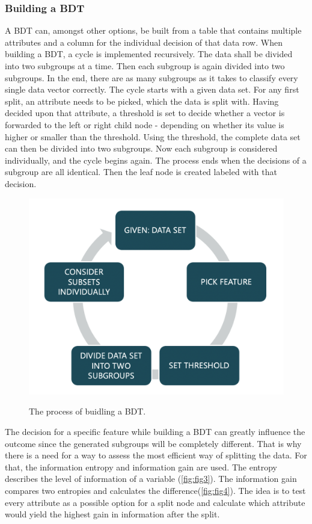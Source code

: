 \documentclass[
12pt,
headsepline,
bibliography=totoc,
twoside=semi,
fleqn
]{scrartcl}
\begin{document}
 \subsubsection{Building a BDT\label{sec:sec2-1-2}}
 A BDT can, amongst other options, be built from a table that contains multiple attributes and a column for the individual decision of that data row. When building a BDT, a cycle is implemented recursively. The data shall be divided into two subgroups at a time. Then each subgroup is again divided into two subgroups. In the end, there are as many subgroups as it takes to classify every single data vector correctly. The cycle starts with a given data set. For any first split, an attribute needs to be picked, which the data is split with. Having decided upon that attribute, a threshold is set to decide whether a vector is forwarded to the left or right child node - depending on whether its value is higher or smaller than the threshold. Using the threshold, the complete data set can then be divided into two subgroups. Now each subgroup is considered individually, and the cycle begins again. The process ends when the decisions of a subgroup are all identical. Then the leaf node is created labeled with that decision. 

 \begin{figure}[H]
 \centering \includegraphics[scale=0.55]{BDT2.png}\label{fig:fig2}
 \caption{The process of buidling a BDT.}
 \end{figure}


 The decision for a specific feature while building a BDT can greatly influence the outcome since the generated subgroups will be completely different. That is why there is a need for a way to assess the most efficient way of splitting the data. For that, the information entropy and information gain are used. The entropy describes the level of information of a variable (\ref{fig:fig3}). The information gain compares two entropies and calculates the difference(\ref{fig:fig4}). The idea is to test every attribute as a possible option for a split node and calculate which attribute would yield the highest gain in information after the split. 
\end{document}
